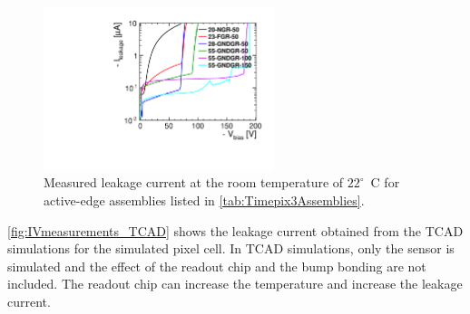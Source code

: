 \begin{figure}[htbp]
  \centering
  \includegraphics[width=0.6\textwidth]{figures/ActiveEdge/IVCurve_Andreas.pdf}
  \caption{Measured leakage current at the room temperature of
    $22^{\circ}$~C for active-edge assemblies listed in
    \cref{tab:Timepix3Assemblies}.}
  \label{fig:IVmeasurements_real}
\end{figure}

\cref{fig:IVmeasurements_TCAD} shows the leakage current obtained from
the TCAD simulations for the simulated pixel cell. In TCAD
simulations, only the sensor is simulated and the effect of the
readout chip and the bump bonding are not included. The readout chip
can increase the temperature and increase the leakage current.



